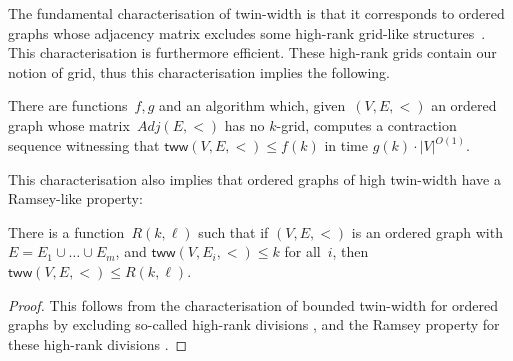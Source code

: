 \documentclass[a4paper,UKenglish,cleveref,thm-restate]{lipics-v2021}
\theoremstyle{remark}
\newcommand{\tww}{\mathsf{tww}}
\newcommand{\adj}{Adj}
\begin{document}
The fundamental characterisation of twin-width is that it corresponds to ordered graphs whose adjacency matrix excludes some high-rank grid-like structures~\cite[Theorem 7]{twin-width4}.
This characterisation is furthermore efficient.
These high-rank grids contain our notion of grid, thus this characterisation implies the following.
\begin{theorem}\label{thm:grid-tww}
    There are functions~$f,g$ and an algorithm which, given~$(V,E,<)$ an ordered graph
    whose matrix~$\adj(E,<)$ has no $k$-grid, computes a contraction sequence witnessing that $\tww(V,E,<) \le f(k)$ in time $g(k) \cdot |V|^{O(1)}$.
\end{theorem}
This characterisation also implies that ordered graphs of high twin-width have a Ramsey-like property:
\begin{theorem}\label{thm:ordered-tww-ramsey}
    There is a function~$R(k,\ell)$ such that if $(V,E,<)$ is an ordered graph with $E = E_1 \cup \dots \cup E_m$, and $\tww(V,E_i,<) \le k$ for all~$i$, then $\tww(V,E,<) \le R(k,\ell)$.
\end{theorem}
\begin{proof}
    This follows from the characterisation of bounded twin-width for ordered graphs by excluding so-called high-rank divisions \cite[Theorems~7 and~23]{twin-width4}, and the Ramsey property for these high-rank divisions \cite[Lemma~24]{twin-width4}.
\end{proof}
\end{document}
